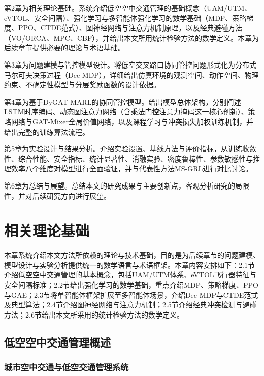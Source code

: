\documentclass[12pt,a4paper,UTF8]{ctexbook}
\begin{document}
第2章为相关理论基础。系统介绍低空空中交通管理的基础概念（UAM/UTM、eVTOL、安全间隔）、强化学习与多智能体强化学习的数学基础（MDP、策略梯度、PPO、CTDE范式）、图神经网络与注意力机制原理，以及经典避碰方法（VO/ORCA、MPC、CBF），并给出本文所用统计检验方法的数学定义。本章为后续章节提供必要的理论与术语基础。

第3章为问题建模与管控模型设计。将低空交叉路口协同管控问题形式化为分布式马尔可夫决策过程（Dec-MDP），详细给出仿真环境的观测空间、动作空间、物理约束、不确定性模型与分层奖励函数的设计依据。

第4章为基于DyGAT-MARL的协同管控模型。给出模型总体架构，分别阐述LSTM时序编码、动态图注意力网络（含乘法门控注意力掩码这一核心创新）、策略网络与GAT-Mixer全局价值网络，以及课程学习与冲突损失加权训练机制，并给出完整的训练算法流程。

第5章为实验设计与结果分析。介绍实验设置、基线方法与评价指标，从训练收敛性、综合性能、安全指标、统计显著性、消融实验、密度鲁棒性、参数敏感性与推理效率八个维度对模型进行全面验证，并与代表性方法MS-GRL进行对比讨论。

第6章为总结与展望。总结本文的研究成果与主要创新点，客观分析研究的局限性，并对后续研究方向进行展望。

\chapter{相关理论基础}

本章系统介绍本文方法所依赖的理论与技术基础，目的是为后续章节的问题建模、模型设计与实验分析提供统一的数学语言与术语框架。本章内容安排如下：2.1节介绍低空空中交通管理的基本概念，包括UAM/UTM体系、eVTOL飞行器特征与安全间隔标准；2.2节给出强化学习的数学基础，重点介绍MDP、策略梯度、PPO与GAE；2.3节将单智能体框架扩展至多智能体场景，介绍Dec-MDP与CTDE范式及典型算法；2.4节介绍图神经网络与注意力机制；2.5节介绍经典冲突检测与避碰方法；2.6节给出本文所采用的统计检验方法的数学定义。

\section{低空空中交通管理概述}

\subsection{城市空中交通与低空交通管理系统}
\end{document}
